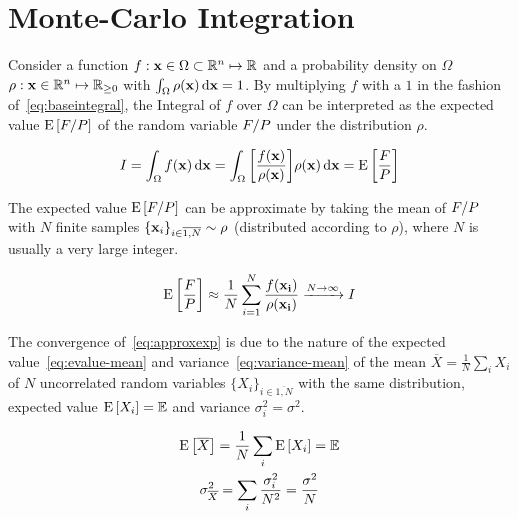
\section{Monte-Carlo Integration}%
\label{sec:mcint}

Consider a function
\(f: \vb{x}\in\Omega\subset\mathbb{R}^n\mapsto\mathbb{R}\) and a
probability density on \(\Omega\)
\(\rho: \vb{x}\in\mathbb{R}^n\mapsto\mathbb{R}_{\geq 0}\) with
\(\int_{\Omega}\rho(\vb{x})\dd{\vb{x}} = 1\).  By multiplying \(f\)
with a \(1\) in the fashion of~\eqref{eq:baseintegral}, the Integral
of \(f\) over \(\Omega\) can be interpreted as the expected value
\(\operatorname{E}\qty[F/P]\) of the random variable \(F/P\)
under the distribution \(\rho\).

\begin{equation}
  \label{eq:baseintegral}
  I = \int_\Omega f(\vb{x}) \dd{\vb{x}} = \int_\Omega
  \qty[\frac{f(\vb{x})}{\rho(\vb{x})}] \rho(\vb{x}) \dd{\vb{x}} = \operatorname{E}\qty[\frac{F}{P}]
\end{equation}

The expected value \(\operatorname{E}\qty[F/P]\) can be approximate by taking the
mean of \(F/P\) with \(N\) finite samples
\(\{\vb{x}_i\}_{i\in\overline{1,N}}\sim\rho\) (distributed according to
\(\rho\)), where \(N\) is usually a very large integer.

\begin{equation}
  \label{eq:approxexp}
  \operatorname{E}\qty[\frac{F}{P}] \approx
  \frac{1}{N}\sum_{i=1}^N\frac{f(\vb{x_i})}{\rho(\vb{x_i})}
  \xrightarrow{N\rightarrow\infty} I
\end{equation}

The convergence of~\eqref{eq:approxexp} is due to the nature of the
expected value~\eqref{eq:evalue-mean} and
variance~\eqref{eq:variance-mean} of the mean
\(\overline{X} = \frac{1}{N}\sum_i X_i\) of \(N\) uncorrelated random
variables \(\{X_i\}_{i\in\overline{1,N}}\) with the same distribution,
expected value \(\operatorname{E}\qty[X_i]=\mathbb{E}\) and variance
\(\sigma_i^2 = \sigma^2\).

\begin{gather}
  \operatorname{E}\qty[\overline{X}] = \frac{1}{N}\sum_i\operatorname{E}\qty[X_i] = \mathbb{E} \label{eq:evalue-mean}\\
  \sigma^2_{\overline{X}} = \sum_i\frac{\sigma_i^2}{N^2} =
                            \frac{\sigma^2}{N}  \label{eq:variance-mean}
\end{gather}

